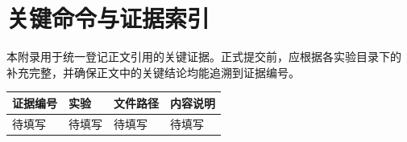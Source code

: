 \section{关键命令与证据索引}

本附录用于统一登记正文引用的关键证据。正式提交前，应根据各实验目录下的  补充完整，并确保正文中的关键结论均能追溯到证据编号。

\begin{longtable}{p{2.2cm}p{2.5cm}p{5.5cm}p{4.2cm}}
\toprule
证据编号 & 实验 & 文件路径 & 内容说明 \\
\midrule
待填写 & 待填写 & 待填写 & 待填写 \\
\bottomrule
\end{longtable}
